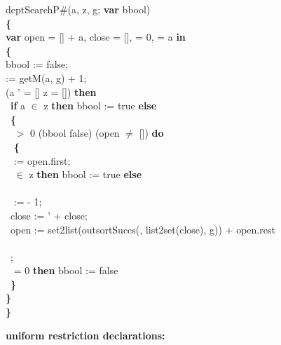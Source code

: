 {\parindent1cm 
deptSearchP\#(a, z, g; {\bf var} bbool) \\
{\bf \{}\\
{\bf var} open = [] + a, close = [],  = 0,  = a {\bf in}\\
{\bf \{}\\
\tabbe bbool := false;\\
\tabbe {} := getM(a, g) + 1;\\
 \Not (a ' = [] \Or z = []) {\bf then}\\
\tabbe \tabif\  {\bf if} a $\in$ z {\bf then} bbool := true {\bf else}\\
\tabbe \tabif\  {\bf \{}\\
\tabbe \tabif\   $>$ 0 \And (bbool \Equiv false) \And (open $\neq$ []) {\bf do}\\
\tabbe \tabif\ \tabbe {} {\bf \{}\\
\tabbe \tabif\ \tabbe {}\tabbe {} := open.first;\\
\tabbe \tabif\ \tabbe {}  $\in$ z {\bf then} bbool := true {\bf else}\\
\tabbe \tabif\ \tabbe {}\tabbe  {\bf \{}\\
\tabbe \tabif\ \tabbe {}\tabbe \tabbe {} :=  - 1;\\
\tabbe \tabif\ \tabbe {}\tabbe \tabbe close :=  ' + close;\\
\tabbe \tabif\ \tabbe {}\tabbe \tabbe open := set2list(outsortSuccs(, list2set(close), g)) + open.rest\\
\tabbe \tabif\ \tabbe {}\tabbe {\bf \}}\\
\tabbe \tabif\ \tabbe {};\\
\tabbe \tabif\   = 0 {\bf then} bbool := false\\
\tabbe \tabif\ {\bf \}}\\
{\bf \}}\\
{\bf \}}
}



\bigskip

{\bf uniform restriction declarations:}

